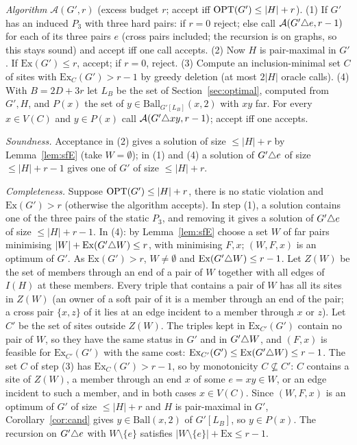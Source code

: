 \emph{Algorithm} $\mathcal A(G',r)$ (excess budget $r$; accept iff $\mathrm{OPT}(G')\le|H|+r$).
(1) If $G'$ has an induced $P_3$ with three hard pairs: if $r=0$ reject; else call $\mathcal A(G'\triangle e,r-1)$ for each of its three pairs $e$ (cross pairs included; the recursion is on graphs, so this stays sound) and accept iff one call accepts.
(2) Now $H$ is pair-maximal in $G'$. If $\mathrm{Ex}(G')\le r$, accept; if $r=0$, reject.
(3) Compute an inclusion-minimal set $C$ of sites with $\mathrm{Ex}_C(G')>r-1$ by greedy deletion (at most $2|H|$ oracle calls).
(4) With $B=2D+3r$ let $L_B$ be the set of Section~\ref{sec:optimal}, computed from $G',H$, and $P(x)$ the set of $y\in\mathrm{Ball}_{G'[L_B]}(x,2)$ with $xy$ far. For every $x\in V(C)$ and $y\in P(x)$ call $\mathcal A(G'\triangle xy,r-1)$; accept iff one accepts.

\emph{Soundness.} Acceptance in (2) gives a solution of size $\le|H|+r$ by Lemma~\ref{lem:sfE} (take $W=\emptyset$); in (1) and (4) a solution of $G'\triangle e$ of size $\le|H|+r-1$ gives one of $G'$ of size $\le|H|+r$.

\emph{Completeness.} Suppose $\mathrm{OPT}(G')\le|H|+r$, there is no static violation and $\mathrm{Ex}(G')>r$ (otherwise the algorithm accepts). In step (1), a solution contains one of the three pairs of the static $P_3$, and removing it gives a solution of $G'\triangle e$ of size $\le|H|+r-1$. In (4): by Lemma~\ref{lem:sfE} choose a set $W$ of far pairs minimising $|W|+\mathrm{Ex}(G'\triangle W)\le r$, with minimising $F,x$; $(W,F,x)$ is an optimum of $G'$. As $\mathrm{Ex}(G')>r$, $W\ne\emptyset$ and $\mathrm{Ex}(G'\triangle W)\le r-1$. Let $Z(W)$ be the set of members through an end of a pair of $W$ together with all edges of $I(H)$ at these members. Every triple that contains a pair of $W$ has all its sites in $Z(W)$ (an owner of a soft pair of it is a member through an end of the pair; a cross pair $\{x,z\}$ of it lies at an edge incident to a member through $x$ or $z$). Let $C'$ be the set of sites outside $Z(W)$. The triples kept in $\mathrm{Ex}_{C'}(G')$ contain no pair of $W$, so they have the same status in $G'$ and in $G'\triangle W$, and $(F,x)$ is feasible for $\mathrm{Ex}_{C'}(G')$ with the same cost: $\mathrm{Ex}_{C'}(G')\le\mathrm{Ex}(G'\triangle W)\le r-1$. The set $C$ of step (3) has $\mathrm{Ex}_C(G')>r-1$, so by monotonicity $C\not\subseteq C'$: $C$ contains a site of $Z(W)$, a member through an end $x$ of some $e=xy\in W$, or an edge incident to such a member, and in both cases $x\in V(C)$. Since $(W,F,x)$ is an optimum of $G'$ of size $\le|H|+r$ and $H$ is pair-maximal in $G'$, Corollary~\ref{cor:cand} gives $y\in\mathrm{Ball}(x,2)$ of $G'[L_B]$, so $y\in P(x)$. The recursion on $G'\triangle e$ with $W\setminus\{e\}$ satisfies $|W\setminus\{e\}|+\mathrm{Ex}\le r-1$.

